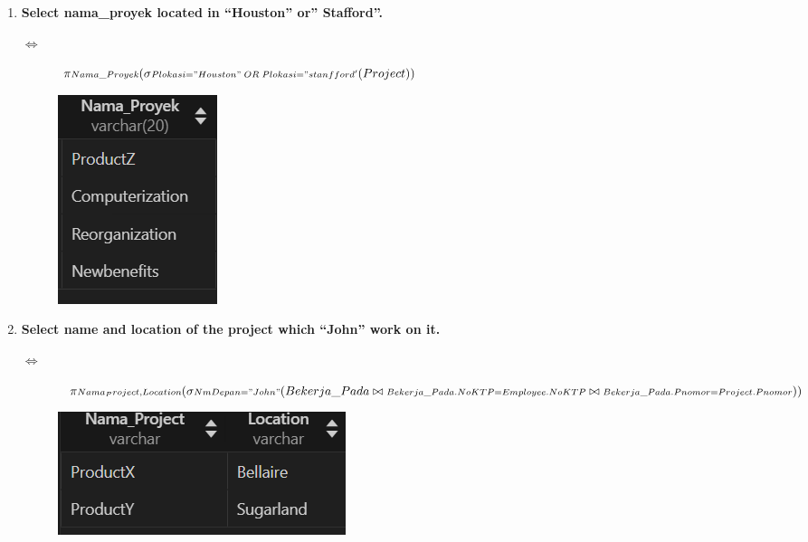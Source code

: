 \documentclass{extarticle}
\begin{document}
\begin{enumerate}
\item {\textbf{Select nama\_proyek located in “Houston” or” Stafford”.}}
\begin{description} 
    \item[$\Leftrightarrow$] {\large $\pi {\scriptstyle Nama\_Proyek}(\sigma{\scriptstyle Plokasi = "Houston" \; OR \; Plokasi = "stanfford'}(Project))$}    
    \item[] \includegraphics[scale=0.7]{7.png}
\end{description}

\item {\textbf{Select name and location of the project which “John” work on it.}}
\begin{description} 
    \item[$\Leftrightarrow$] {\large $\pi {\scriptstyle Nama_Project,Location}(\sigma{\scriptstyle NmDepan = "John"}(Bekerja\_Pada \bowtie \\{\scriptstyle Bekerja\_Pada.NoKTP = Employee.NoKTP} \bowtie  {\scriptstyle Bekerja\_Pada.Pnomor = Project.Pnomor}))$}    
    \item[] \includegraphics[scale=0.7]{8.png}
    \end{description}
    

\end{enumerate}
\end{document}
